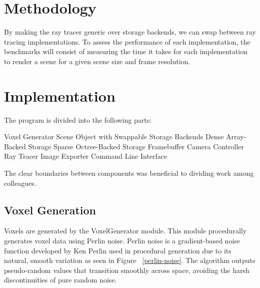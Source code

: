 \documentclass[conference]{IEEEtran}
\begin{document}
\section{Methodology}

By making the ray tracer generic over storage backends, we can swap between ray tracing implementations.
To assess the performance of each implementation, the benchmarks will consist of measuring the time it takes for each implementation to render a scene for a given scene size and frame resolution.

\section{Implementation}

The program is divided into the following parts:

\begin{outline}
\1 Voxel Generator
\1 Scene Object with Swappable Storage Backends
\2 Dense Array-Backed Storage
\2 Sparse Octree-Backed Storage
\1 Framebuffer
\1 Camera Controller
\1 Ray Tracer
\1 Image Exporter
\1 Command Line Interface
\end{outline}

The clear boundaries between components was beneficial to dividing work among colleagues.

\subsection{Voxel Generation}

Voxels are generated by the VoxelGenerator module. This module procedurally generates voxel data using Perlin noise. Perlin noise is a gradient-based noise function developed by Ken Perlin used in procedural generation due to its natural, smooth variation \cite{perlin} as seen in Figure ~\ref{perlin-noise}. The algorithm outputs pseudo-random values that transition smoothly across space, avoiding the harsh discontinuities of pure random noise.
\end{document}
